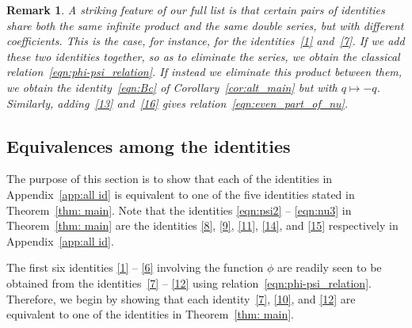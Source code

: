 \documentclass[11pt,reqno]{amsart}
\renewcommand{\=}{\;=\;}
\theoremstyle{myremark}
\newtheorem{remark}{Remark}
\begin{document}
\begin{remark} \label{rmk:proj_lin_comb}
A striking feature of our full list is that certain pairs of identities share both the same infinite product and the same double series, but with different coefficients. 
This is the case, for instance, for the identities~\ref{1} and~\ref{7}. If we add these two identities together, so as to eliminate the series, we obtain the classical relation~\eqref{eqn:phi-psi_relation}. 
If instead we eliminate this product between them, we obtain the identity~\eqref{eqn:Bc} of Corollary~\ref{cor:alt_main} but with $q \mapsto -q$. Similarly, adding~\ref{13} and~\ref{16} gives relation~\ref{eqn:even_part_of_nu}.
\end{remark}

\subsection{Equivalences among the identities}
\label{sec:otherids}

The purpose of this section is to show that each of the identities in Appendix~\ref{app:all id} is equivalent to one of the five identities stated in Theorem~\ref{thm: main}. 
Note that the identities \eqref{eqn:psi2} -- \eqref{eqn:nu3} in Theorem~\ref{thm: main} are the identities \ref{8}, \ref{9}, \ref{11}, \ref{14}, and \ref{15} respectively in Appendix~\ref{app:all id}.

The first six identities \ref{1} -- \ref{6} involving the function $\phi$ are readily seen to be obtained from the identities~\ref{7} -- \ref{12} using relation~\eqref{eqn:phi-psi_relation}. 
Therefore, we begin by showing that each identity~\ref{7}, \ref{10}, and \ref{12} are equivalent to one of the identities in Theorem~\ref{thm: main}.
\end{document}
